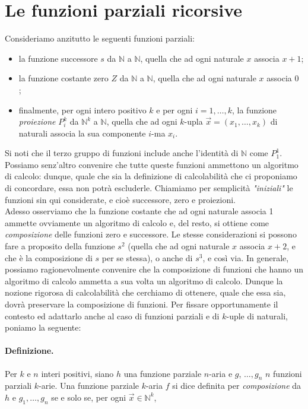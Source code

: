 \section{Le funzioni parziali ricorsive}
Consideriamo anzitutto le seguenti funzioni
parziali:

\begin{itemize}
    \item la funzione successore $s$ da $\mathbb{N}$ a $\mathbb{N}$, quella
          che ad ogni naturale $x$ associa $x+1$;
    \item la funzione costante zero $Z$ da
          $\mathbb{N}$ a $\mathbb{N}$, quella che ad ogni naturale $x$ associa 0 ;
    \item finalmente, per ogni intero positivo $k$ e per ogni $i=1, \ldots, k$, la
          funzione \textit{proiezione} $P_i^k$ da $\mathbb{N}^k$ a $\mathbb{N}$, quella che ad ogni
          $k$-upla $\vec{x}=\left(x_1, \ldots, x_k\right)$ di naturali associa la sua
          componente $i$-ma $x_i$.
\end{itemize}

Si noti che il terzo gruppo di funzioni include anche l'identità di $\mathbb{N}$
come $P_1^1$. Possiamo senz'altro convenire che tutte queste funzioni
ammettono un algoritmo di calcolo: dunque, quale che sia la definizione di
calcolabilità che ci proponiamo di concordare, essa non potrà escluderle.
Chiamiamo per semplicità \textit{"iniziali"} le funzioni sin qui considerate, e cioè
successore, zero e proiezioni.\\

Adesso osserviamo che la funzione costante che ad ogni naturale associa 1
ammette ovviamente un algoritmo di calcolo e, del resto, si ottiene come
\textit{composizione} delle funzioni zero e successore. Le stesse considerazioni si
possono fare a proposito della funzione $s^2$ (quella che ad ogni naturale $x$
associa $x+2$, e che è la composizione di $s$ per se stessa), o anche di $s^3$,
e così via. In generale, possiamo ragionevolmente convenire che la composizione
di funzioni che hanno un algoritmo di calcolo ammetta a sua volta un algoritmo
di calcolo. Dunque la nozione rigorosa di calcolabilità che cerchiamo di
ottenere, quale che essa sia, dovrà preservare la composizione di funzioni. Per
fissare opportunamente il contesto ed adattarlo anche al caso di funzioni
parziali e di $k$-uple di naturali, poniamo la seguente:

\paragraph{Definizione.} Per $k$ e $n$ interi positivi, siano $h$ una funzione parziale
$n$-aria e $g$, $\ldots, g_n$ $n$ funzioni parziali $k$-arie. Una funzione
parziale $k$-aria $f$ si dice definita per \textit{composizione} da $h$ e $g_1, \ldots,
    g_n$ se e solo se, per ogni $\vec{x} \in \mathbb{N}^k$,

